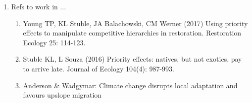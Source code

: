 \documentclass[11pt]{article}
\begin{document}
\begin{enumerate}
\begin{enumerate}
\begin{enumerate}
\end{enumerate}
\end{enumerate}
\item Refs to work in ...
\begin{enumerate}
\item Young TP, KL Stuble, JA Balachowski, CM Werner (2017) Using priority effects to manipulate competitive hierarchies in restoration. Restoration Ecology 25: 114-123.
\item Stuble KL, L Souza (2016) Priority effects: natives, but not exotics, pay to arrive late. Journal of Ecology 104(4): 987-993.
\item Anderson \& Wadgymar: Climate change disrupts local adaptation and favours upslope migration %
\end{enumerate}
\end{enumerate}





\end{document}
